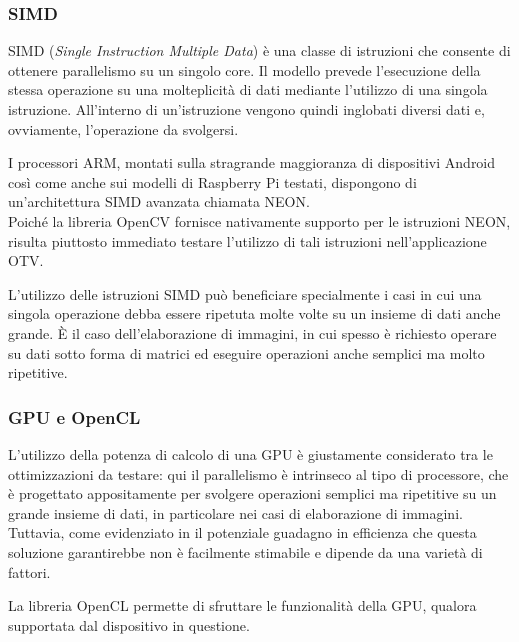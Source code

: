 \subsubsection{SIMD}

SIMD (\textit{Single Instruction Multiple Data}) è una classe di istruzioni che consente di ottenere parallelismo su un
singolo core. Il modello prevede l'esecuzione della stessa operazione su una molteplicità di dati mediante l'utilizzo di una
singola istruzione. All'interno di un'istruzione vengono quindi inglobati diversi dati e, ovviamente, l'operazione da svolgersi.

I processori ARM, montati sulla stragrande maggioranza di dispositivi Android così come anche sui modelli di Raspberry Pi testati,
dispongono di un'architettura SIMD avanzata chiamata NEON.\\%
Poiché la libreria OpenCV fornisce nativamente supporto per le istruzioni NEON, risulta piuttosto immediato testare l'utilizzo di
tali istruzioni nell'applicazione OTV.

L'utilizzo delle istruzioni SIMD può beneficiare specialmente i casi in cui una singola operazione debba essere ripetuta molte
volte su un insieme di dati anche grande. È il caso dell'elaborazione di immagini, in cui spesso è richiesto operare su dati sotto
forma di matrici ed eseguire operazioni anche semplici ma molto ripetitive.

\subsubsection{GPU e OpenCL}

L'utilizzo della potenza di calcolo di una GPU è giustamente considerato tra le ottimizzazioni da testare: qui il parallelismo
è intrinseco al tipo di processore, che è progettato appositamente per svolgere operazioni semplici ma ripetitive su un grande
insieme di dati, in particolare nei casi di elaborazione di immagini. Tuttavia, come evidenziato in \cite{rs12122047}
il potenziale guadagno in efficienza che questa soluzione garantirebbe non è facilmente stimabile e dipende da una varietà di
fattori.

La libreria OpenCL permette di sfruttare le funzionalità della GPU, qualora supportata dal dispositivo in questione.
